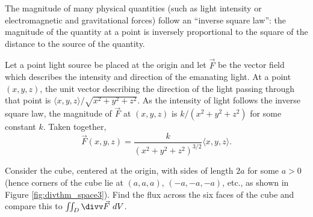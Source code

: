 {The magnitude of many physical quantities (such as light intensity or electromagnetic and gravitational forces) follow an ``inverse square law'': the magnitude of the quantity at a point is inversely proportional to the square of the distance to the source of the quantity. 

Let a point light source be placed at the origin and let $\vec F$ be the vector field which describes the intensity and direction of the emanating light. At a point $(x,y,z)$, the unit vector describing the direction of the light passing through that point is $\langle x,y,z\rangle/\sqrt{x^2+y^2+z^2}$. As the intensity of light follows the inverse square law, the magnitude of $\vec F$ at $(x,y,z)$ is $k/(x^2+y^2+z^2)$ for some constant $k$. Taken together, 
$$\vec F(x,y,z) = \frac{k}{(x^2+y^2+z^2)^{3/2}}\langle x,y,z\rangle.$$

Consider the cube, centered at the origin, with sides of length $2a$ for some $a>0$ (hence corners of the cube lie at $(a,a,a)$, $(-a,-a,-a)$, etc., as shown in Figure \ref{fig:divthm_space3}). Find the flux across the six faces of the cube and compare this to $\iint_D \divv\vec F\ dV$.
}
